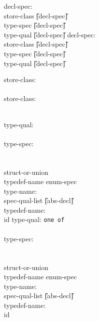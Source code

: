\begin{center}
\PAIR
{
decl-spec:\\
\>	store-class \U{[}decl-spec\U{]} \\
\>	type-spec  \U{[}decl-spec\U{]} \\
\> 	type-qual  \U{[}decl-spec\U{]} 
} 
{
decl-spec:\\
\>	store-class \U{[}decl-spec\U{]} \\
\>	type-spec \U{[}decl-spec\U{]} \\
\>	type-qual \U{[}decl-spec\U{]}
}

\PAIR
{
store-class:   \\
\>	   \\
\>	  
}
{
store-class:   \\
\>	   \\
\>	  
}


\PAIR
{
type-qual:  \\
\> 	  \\
type-spec:  \\
\>	    \\
\>          \\
\>	   struct-or-union \\
\>	typedef-name enum-spec\\
type-name: \\
\>	spec-qual-list \U{[}abs-decl\U{]}\\
typedef-name: \\
\>	id
}
{
type-qual: {\tt one of} \\
\>	  \\ 
type-spec:  \\
\>	    \\
\>          \\
\>	   struct-or-union \\
\>	typedef-name enum-spec \\
type-name: \\
\>	spec-qual-list \U{[}abs-decl\U{]}\\
typedef-name: \\
\>	id
}


\end{center}
